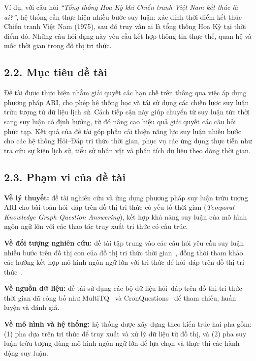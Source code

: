 Ví dụ, với câu hỏi \textit{``Tổng thống Hoa Kỳ khi Chiến tranh Việt Nam kết thúc là ai?''}, hệ
thống cần thực hiện nhiều bước suy luận: xác định thời điểm kết thúc Chiến tranh Việt Nam (1975),
sau đó truy vấn ai là tổng thống Hoa Kỳ tại thời điểm đó. Những câu hỏi dạng này yêu cầu kết hợp
thông tin thực thể, quan hệ và mốc thời gian trong đồ thị tri thức.

\subsection*{2.2. Mục tiêu đề tài}

Đề tài được thực hiện nhằm giải quyết các hạn chế trên thông qua việc áp dụng phương pháp ARI, cho
phép hệ thống học và tái sử dụng các chiến lược suy luận trừu tượng từ dữ liệu lịch sử. Cách tiếp
cận này giúp chuyển từ suy luận tức thời sang suy luận có định hướng, từ đó nâng cao hiệu quả giải
quyết các câu hỏi phức tạp. Kết quả của đề tài góp phần cải thiện năng lực suy luận nhiều bước cho
các hệ thống Hỏi--Đáp tri thức thời gian, phục vụ các ứng dụng thực tiễn như tra cứu sự kiện lịch
sử, tiểu sử nhân vật và phân tích dữ liệu theo dòng thời gian.

\subsection*{2.3. Phạm vi của đề tài}

\textbf{Về lý thuyết:} đề tài nghiên cứu và ứng dụng phương pháp suy luận trừu tượng ARI cho bài
toán hỏi--đáp trên đồ thị tri thức có yếu tố thời gian (\textit{Temporal Knowledge Graph Question
Answering}), kết hợp khả năng suy luận của mô hình ngôn ngữ lớn với các thao tác truy xuất tri thức
có cấu trúc.

\textbf{Về đối tượng nghiên cứu:} đề tài tập trung vào các câu hỏi yêu cầu suy luận nhiều bước trên
đồ thị con của đồ thị tri thức thời gian~\cite{chen2022subgraph}, đồng thời tham khảo các hướng kết
hợp mô hình ngôn ngữ lớn với tri thức để hỏi--đáp trên đồ thị tri thức~\cite{baek2023kaping}.

\textbf{Về nguồn dữ liệu:} đề tài sử dụng các bộ dữ liệu hỏi--đáp trên đồ thị tri thức thời gian đã
công bố như MultiTQ~\cite{chen2023multitq} và CronQuestions~\cite{saxena2021cronkgqa} để tham chiếu,
huấn luyện và đánh giá.

\textbf{Về mô hình và hệ thống:} hệ thống được xây dựng theo kiến trúc hai pha gồm: (1) pha dựa trên
tri thức để truy xuất và xử lý dữ liệu từ đồ thị, và (2) pha suy luận trừu tượng dùng mô hình ngôn
ngữ lớn để lựa chọn và thực thi các hành động suy luận.

